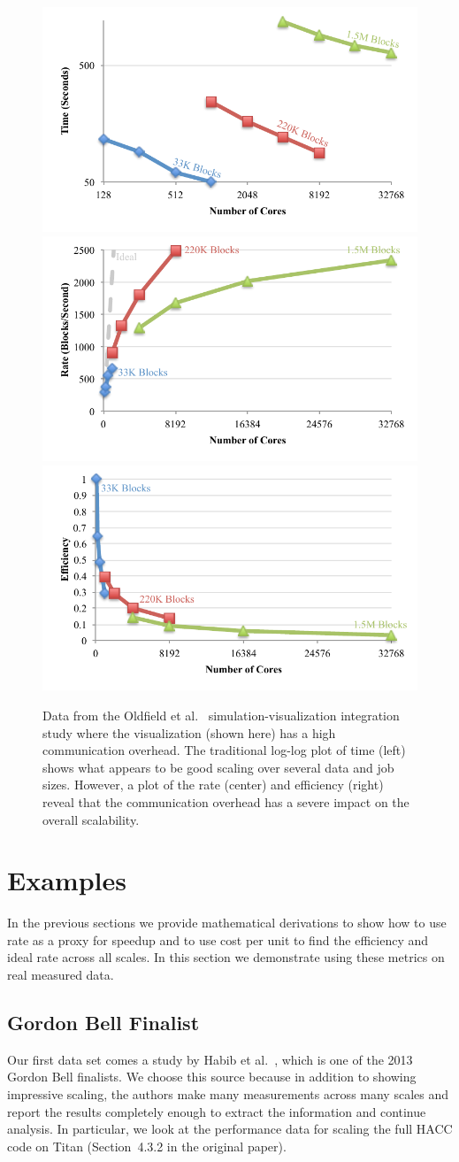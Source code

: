 \documentclass[conference]{IEEEtran}
\newcommand*{\scite}[1]{~\cite{#1}}
\newcommand{\etal}{et al.\xspace}
\begin{document}
\begin{figure}
  \includegraphics[width=.33\linewidth]{images/OldfieldTimeLog}%
  \includegraphics[width=.33\linewidth]{images/OldfieldRate}%
  \includegraphics[width=.33\linewidth]{images/OldfieldEfficiency}
  \caption{Data from the Oldfield \etal\scite{Oldfield2014,Rogers2013}
    simulation-visualization integration study where the visualization
    (shown here) has a high communication overhead. The traditional log-log
    plot of time (left) shows what appears to be good scaling over several
    data and job sizes. However, a plot of the rate (center) and efficiency
    (right) reveal that the communication overhead has a severe impact on
    the overall scalability.}
  \label{fig:Oldfield}
\end{figure}


\section{Examples}

\noindent
In the previous sections we provide mathematical derivations to show how
to use rate as a proxy for speedup and to use cost per unit to find the
efficiency and ideal rate across all scales. In this section we demonstrate
using these metrics on real measured data.

\subsection{Gordon Bell Finalist}

\noindent
Our first data set comes a study by Habib \etal\scite{Habib2013}, which is
one of the 2013 Gordon Bell finalists. We choose this source because in
addition to showing impressive scaling, the authors make many measurements
across many scales and report the results completely enough to extract the
information and continue analysis. In particular, we look at the
performance data for scaling the full HACC code on Titan (Section~4.3.2 in
the original paper).
\end{document}
